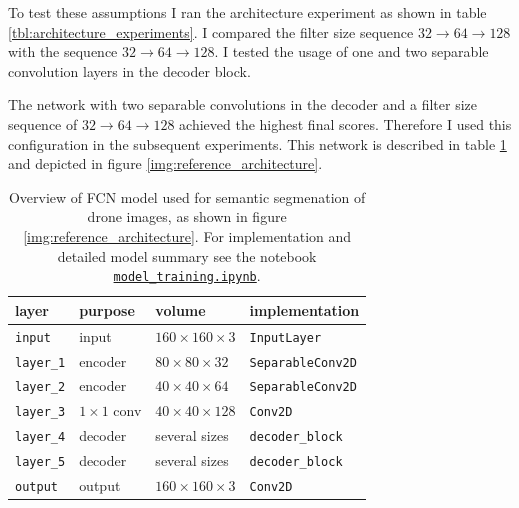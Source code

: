 \documentclass[11pt, onecolumn, oneside, reqno]{article}
\begin{document}
To test these assumptions I ran the architecture experiment as shown in table \ref{tbl:architecture_experiments}. I compared the filter size sequence $32 \rightarrow 64 \rightarrow 128$ with the sequence $32 \rightarrow 64 \rightarrow 128$. I tested the usage of one and two separable convolution layers in the decoder block.

The network with two separable convolutions in the decoder and a filter size sequence of $32 \rightarrow 64 \rightarrow 128$ achieved the highest final scores.  Therefore I used this configuration in the subsequent experiments. This network is described in table \ref{tbl:fcn_architecture} and depicted in figure \ref{img:reference_architecture}.

{\renewcommand{\arraystretch}{2}%
\begin{table}
\centering
\begin{tabular}{|l|l|l|l|}
\hline 
layer             & purpose           & volume                    & implementation          \\
\hline
\texttt{input}    & input             & $160 \times 160 \times 3$ & \texttt{InputLayer}     \\
\texttt{layer\_1} & encoder           & $80 \times 80 \times 32$  & \texttt{SeparableConv2D}\\
\texttt{layer\_2} & encoder           & $40 \times 40 \times 64$  & \texttt{SeparableConv2D}\\
\texttt{layer\_3} & $1 \times 1$ conv & $40 \times 40 \times 128$ & \texttt{Conv2D}         \\
\texttt{layer\_4} & decoder           & several sizes             & \texttt{decoder\_block}  \\
\texttt{layer\_5} & decoder           & several sizes             & \texttt{decoder\_block}  \\
\texttt{output}   & output            & $160 \times 160 \times 3$ & \texttt{Conv2D}         \\
\hline
\end{tabular}%
\caption[FCN model properties]{Overview of FCN model used for semantic segmenation of drone images, as shown in figure \ref{img:reference_architecture}. For implementation and detailed model summary see the notebook \href{https://github.com/S2H-Mobile/RoboND-DeepLearning-Project-Solution/blob/master/code/model_training.ipynb}{\texttt{model\_training.ipynb}}.}
\label{tbl:fcn_architecture}
\end{table}

}
\end{document}

